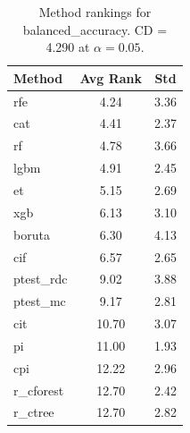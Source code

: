 \begin{table}[h]
\centering
\caption{Method rankings for balanced_accuracy. CD = 4.290 at $\alpha=0.05$.}
\label{tab:ranks_balanced_accuracy}
\begin{tabular}{lcc}
\toprule
Method & Avg Rank & Std \\
\midrule
rfe & 4.24 & 3.36 \\
cat & 4.41 & 2.37 \\
rf & 4.78 & 3.66 \\
lgbm & 4.91 & 2.45 \\
et & 5.15 & 2.69 \\
xgb & 6.13 & 3.10 \\
boruta & 6.30 & 4.13 \\
cif & 6.57 & 2.65 \\
ptest_rdc & 9.02 & 3.88 \\
ptest_mc & 9.17 & 2.81 \\
cit & 10.70 & 3.07 \\
pi & 11.00 & 1.93 \\
cpi & 12.22 & 2.96 \\
r_cforest & 12.70 & 2.42 \\
r_ctree & 12.70 & 2.82 \\
\bottomrule
\end{tabular}
\end{table}